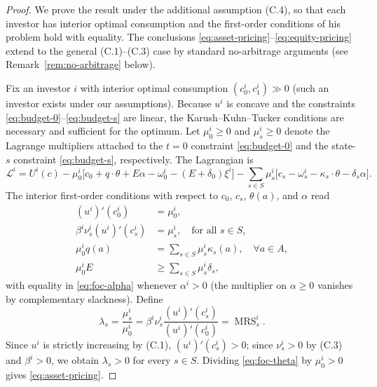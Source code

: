 \documentclass[11pt,a4paper,oneside]{book}
\def\geq{\geqslant}
\DeclareMathOperator{\MRS}{MRS}
\theoremstyle{plain}
\theoremstyle{definition}
\theoremstyle{remark}
\numberwithin{equation}{chapter}
\begin{document}
\begin{proof}
We prove the result under the additional assumption (C.4), so that each investor has interior optimal consumption and the first-order conditions of his problem hold with equality.
The conclusions \eqref{eq:asset-pricing}--\eqref{eq:equity-pricing} extend to the general (C.1)--(C.3) case by standard no-arbitrage arguments (see Remark~\ref{rem:no-arbitrage} below).

Fix an investor $i$ with interior optimal consumption $(c^i_0, c^i_1) \gg 0$ (such an investor exists under our assumptions).
Because $u^i$ is concave and the constraints \eqref{eq:budget-0}--\eqref{eq:budget-s} are linear, the Karush--Kuhn--Tucker conditions are necessary and sufficient for the optimum.
Let $\mu^i_0 \geq 0$ and $\mu^i_s \geq 0$ denote the Lagrange multipliers attached to the $t=0$ constraint \eqref{eq:budget-0} and the state-$s$ constraint \eqref{eq:budget-s}, respectively.
The Lagrangian is
\begin{equation*}
  \mathcal{L}^i = U^i(c) - \mu^i_0 \bigl[ c_0 + q \cdot \theta + E \alpha - \omega^i_0 - (E + \delta_0) \xi^i \bigr]
  - \sum_{s \in S} \mu^i_s \bigl[ c_s - \omega^i_s - \kappa_s \cdot \theta - \delta_s \alpha \bigr].
\end{equation*}
The interior first-order conditions with respect to $c_0$, $c_s$, $\theta(a)$, and $\alpha$ read
\begin{align}
  (u^i)'(c^i_0) &= \mu^i_0,
  \label{eq:foc-c0}\\
  \beta^i \nu^i_s (u^i)'(c^i_s) &= \mu^i_s,
  \quad \text{for all $s\in S$},
  \label{eq:foc-cs}\\
  \mu^i_0 q(a) &= \sum_{s \in S} \mu^i_s \kappa_s(a),
  \quad \forall a \in A,
  \label{eq:foc-theta}\\
  \mu^i_0 E &\geq \sum_{s \in S} \mu^i_s \delta_s,
  \label{eq:foc-alpha}
\end{align}
with equality in \eqref{eq:foc-alpha} whenever $\alpha^i > 0$ (the multiplier on $\alpha \geq 0$ vanishes by complementary slackness).
Define
\begin{equation}\label{eq:lambda-def}
  \lambda_s = \frac{\mu^i_s}{\mu^i_0} = \beta^i \nu^i_s \frac{(u^i)'(c^i_s)}{(u^i)'(c^i_0)} = \MRS^i_s.
\end{equation}
Since $u^i$ is strictly increasing by (C.1), $(u^i)'(c^i_s) > 0$; since $\nu^i_s > 0$ by (C.3) and $\beta^i > 0$, we obtain $\lambda_s > 0$ for every $s \in S$.
Dividing \eqref{eq:foc-theta} by $\mu^i_0 > 0$ gives \eqref{eq:asset-pricing}.


\end{proof}
\end{document}

